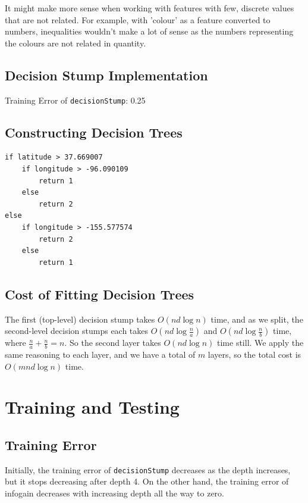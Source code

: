 \documentclass{article}
\begin{document}
It might make more sense when working with features with few, discrete values that are not related. For example, with 'colour' as a feature converted to numbers, inequalities wouldn't make a lot of sense as the numbers representing the colours are not related in quantity.

\subsection{Decision Stump Implementation}

Training Error of \texttt{decisionStump}: 0.25

\subsection{Constructing Decision Trees}
\begin{verbatim}
if latitude > 37.669007
    if longitude > -96.090109
        return 1
    else
        return 2
else
    if longitude > -155.577574
        return 2
    else
        return 1
\end{verbatim}



\subsection{Cost of Fitting Decision Trees}

The first (top-level) decision stump takes $O(nd\log{n})$ time, and as we split, the second-level decision stumps each takes $O(nd\log{\frac{n}{a}})$ and $O(nd\log{\frac{n}{b}})$ time, where $\frac{n}{a} + \frac{n}{b} = n$. So the second layer takes $O(nd\log{n})$ time still. We apply the same reasoning to each layer, and we have a total of $m$ layers, so the total cost is $O(mnd\log{n})$ time.

\section{Training and Testing}

\subsection{Training Error}

Initially, the training error of \texttt{decisionStump} decreases as the depth increases, but it stops decreasing after depth 4. On the other hand, the training error of infogain decreases with increasing depth all the way to zero.
\end{document}
